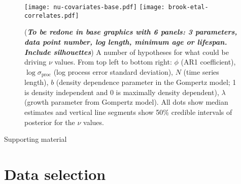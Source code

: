 \documentclass[11pt]{article}
\begin{document}

\clearpage

\begin{figure}[htbp]
\begin{center}
\texttt{[image: nu-covariates-base.pdf]}
\texttt{[image: brook-etal-correlates.pdf]}
\caption{
  (\textit{\textbf{To be redone in base graphics with 6 panels: 3 parameters, data point number, log length, minimum age or lifespan. Include silhouettes}})
  A number of hypotheses for what could be driving $\nu$ values. From top left to bottom right: $\phi$ (AR1 coefficient), $\log \sigma_\mathrm{proc}$ (log process error standard deviation), $N$ (time series length), $b$ (density dependence parameter in the Gompertz model; 1 is density independent and 0 is maximally density dependent), $\lambda$ (growth parameter from Gompertz model).  
  All dots show median estimates and vertical line segments show 50\% credible intervals of posterior for the $\nu$ values.}
\label{fig:correlates}
\end{center}
\end{figure}

\clearpage

\begin{centering}
\LARGE
Supporting material\\[1.5em]
\end{centering}

\section{Data selection}
\end{document}

